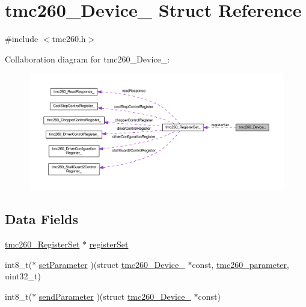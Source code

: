 \hypertarget{structtmc260___device__}{}\section{tmc260\+\_\+\+Device\+\_\+ Struct Reference}
\label{structtmc260___device__}


{\ttfamily \#include $<$tmc260.\+h$>$}



Collaboration diagram for tmc260\+\_\+\+Device\+\_\+\+:\nopagebreak
\begin{figure}[H]
\begin{center}
\leavevmode
\includegraphics[width=350pt]{structtmc260___device____coll__graph}
\end{center}
\end{figure}
\subsection*{Data Fields}
\begin{DoxyCompactItemize}
\item 
\mbox{\hyperlink{tmc260_8h_a71348958a41c5e0cfdf99d907eb2ab3c}{tmc260\+\_\+\+Register\+Set}} $\ast$ \mbox{\hyperlink{structtmc260___device___a4eda80dc5e75cfc6f0e31dbf1813f418}{register\+Set}}
\item 
int8\+\_\+t($\ast$ \mbox{\hyperlink{structtmc260___device___a715a7a311876d9340872cb1d16652aeb}{set\+Parameter}} )(struct \mbox{\hyperlink{structtmc260___device__}{tmc260\+\_\+\+Device\+\_\+}} $\ast$const, \mbox{\hyperlink{tmc260_8h_af9376d3cf645591c7044d834be46c514}{tmc260\+\_\+parameter}}, uint32\+\_\+t)
\item 
int8\+\_\+t($\ast$ \mbox{\hyperlink{structtmc260___device___ac7d5bdab96761c76f99aa33aa1beb2bf}{send\+Parameter}} )(struct \mbox{\hyperlink{structtmc260___device__}{tmc260\+\_\+\+Device\+\_\+}} $\ast$const)
\end{DoxyCompactItemize}


